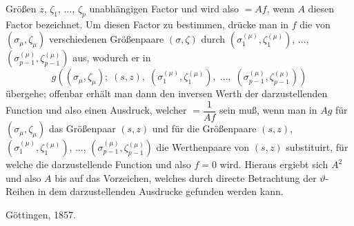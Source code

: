 \documentclass{article}
\begin{document}
Größen $z$, $\zeta_{1}$, $\ldots$, $\zeta_{p}$ unabhängigen Factor und wird also $= Af$, wenn $A$ diesen Factor bezeichnet. Um diesen Factor zu bestimmen, drücke man in $f$ die von $(\sigma_{\mu}, \zeta_{\mu})$ verschiedenen Größenpaare $(\sigma, \zeta)$ durch $(\sigma_{1}^{(\mu)}, \zeta_{1}^{(\mu)})$, $\ldots$, $(\sigma_{p-1}^{(\mu)}, \zeta_{p-1}^{(\mu)})$ aus, wodurch er in
\[ g((\sigma_{\mu}, \zeta_{\mu}); \; (s, z), \; (\sigma_{1}^{(\mu)}, \zeta_{1}^{(\mu)}), \; \ldots, \; (\sigma_{p-1}^{(\mu)}, \zeta_{p-1}^{(\mu)})) \]
übergehe; offenbar erhält man dann den inversen Werth der darzustellenden Function und also einen Ausdruck, welcher $= \dfrac{1}{Af}$ sein muß, wenn man in $Ag$ für $(\sigma_{\mu}, \zeta_{\mu})$ das Größenpaar $(s, z)$ und für die Größenpaare $(s, z)$, $(\sigma_{1}^{(\mu)}, \zeta_{1}^{(\mu)})$, $\ldots$, $(\sigma_{p-1}^{(\mu)}, \zeta_{p-1}^{(\mu)})$ die Werthenpaare von $(s, z)$ substituirt, für welche die darzustellende Function und also $f = 0$ wird. Hieraus ergiebt sich $A^{2}$ und also $A$ bis auf das Vorzeichen, welches durch directe Betrachtung der $\vartheta$-Reihen in dem darzustellenden Ausdrucke gefunden werden kann.

Göttingen, 1857.
\end{document}
